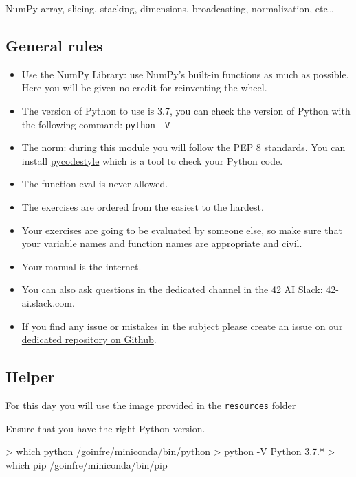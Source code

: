 \documentclass[]{article}
\newenvironment{Shaded}{\begin{snugshade}}{\end{snugshade}}
\newcommand{\NormalTok}[1]{\textcolor[rgb]{0.81,0.81,0.76}{#1}}
\begin{document}
NumPy array, slicing, stacking, dimensions, broadcasting, normalization,
etc\ldots{}

\hypertarget{general-rules}{%
\subsection{General rules}\label{general-rules}}

\begin{itemize}
\item
  Use the NumPy Library: use NumPy's built-in functions as much as
  possible. Here you will be given no credit for reinventing the wheel.
\item
  The version of Python to use is 3.7, you can check the version of
  Python with the following command: \texttt{python\ -V}
\item
  The norm: during this module you will follow the
  \href{https://www.python.org/dev/peps/pep-0008/}{PEP 8 standards}. You
  can install \href{https://pypi.org/project/pycodestyle}{pycodestyle}
  which is a tool to check your Python code.
\item
  The function eval is never allowed.
\item
  The exercises are ordered from the easiest to the hardest.
\item
  Your exercises are going to be evaluated by someone else, so make sure
  that your variable names and function names are appropriate and civil.
\item
  Your manual is the internet.
\item
  You can also ask questions in the dedicated channel in the 42 AI
  Slack: 42-ai.slack.com.
\item
  If you find any issue or mistakes in the subject please create an
  issue on our
  \href{https://github.com/42-AI/bootcamp_python/issues}{dedicated
  repository on Github}.
\end{itemize}

\hypertarget{helper}{%
\subsection{Helper}\label{helper}}

For this day you will use the image provided in the \texttt{resources}
folder

Ensure that you have the right Python version.

\begin{Shaded}
\begin{Highlighting}[]
\NormalTok{> which python}
\NormalTok{/goinfre/miniconda/bin/python}
\NormalTok{> python -V}
\NormalTok{Python 3.7.*}
\NormalTok{> which pip}
\NormalTok{/goinfre/miniconda/bin/pip}
\end{Highlighting}
\end{Shaded}
\end{document}
